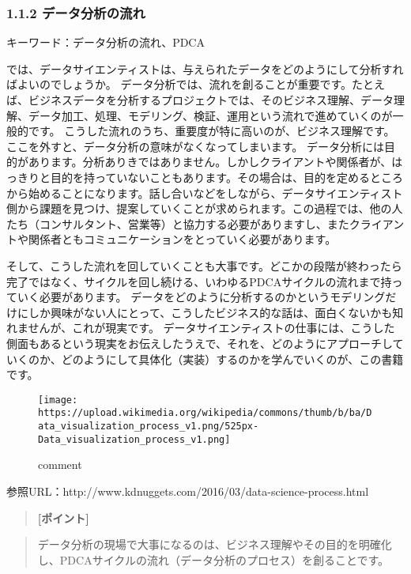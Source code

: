 \documentclass[11pt]{article}
\makeatletter
\def\maxwidth{\ifdim\Gin@nat@width>\linewidth\linewidth
    \else\Gin@nat@width\fi}
\let\Oldincludegraphics\includegraphics
\renewcommand{\includegraphics}[1]{\Oldincludegraphics[width=.8\maxwidth]{#1}}
\makeatother
\begin{document}
    \subsubsection{1.1.2
データ分析の流れ}\label{ux30c7ux30fcux30bfux5206ux6790ux306eux6d41ux308c}

キーワード：データ分析の流れ、PDCA

    では、データサイエンティストは、与えられたデータをどのようにして分析すればよいのでしょうか。
データ分析では、流れを創ることが重要です。たとえば、ビジネスデータを分析するプロジェクトでは、そのビジネス理解、データ理解、データ加工、処理、モデリング、検証、運用という流れで進めていくのが一般的です。
こうした流れのうち、重要度が特に高いのが、ビジネス理解です。ここを外すと、データ分析の意味がなくなってしまいます。
データ分析には目的があります。分析ありきではありません。しかしクライアントや関係者が、はっきりと目的を持っていないこともあります。その場合は、目的を定めるところから始めることになります。話し合いなどをしながら、データサイエンティスト側から課題を見つけ、提案していくことが求められます。この過程では、他の人たち（コンサルタント、営業等）と協力する必要がありますし、またクライアントや関係者ともコミュニケーションをとっていく必要があります。

そして、こうした流れを回していくことも大事です。どこかの段階が終わったら完了ではなく、サイクルを回し続ける、いわゆるPDCAサイクルの流れまで持っていく必要があります。
データをどのように分析するのかというモデリングだけにしか興味がない人にとって、こうしたビジネス的な話は、面白くないかも知れませんが、これが現実です。
データサイエンティストの仕事には、こうした側面もあるという現実をお伝えしたうえで、それを、どのようにアプローチしていくのか、どのようにして具体化（実装）するのかを学んでいくのが、この書籍です。

    \begin{figure}
\centering
\texttt{[image: https://upload.wikimedia.org/wikipedia/commons/thumb/b/ba/Data\_visualization\_process\_v1.png/525px-Data\_visualization\_process\_v1.png]}
\caption{comment}
\end{figure}

    参照URL：http://www.kdnuggets.com/2016/03/data-science-process.html

    \begin{quote}
\textbf{{[}ポイント{]}}
\end{quote}

\begin{quote}
データ分析の現場で大事になるのは、ビジネス理解やその目的を明確化し、PDCAサイクルの流れ（データ分析のプロセス）を創ることです。
\end{quote}
\end{document}
